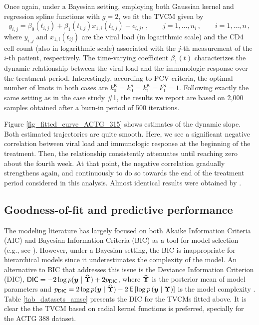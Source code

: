 \documentclass[letterpaper,10pt,openany]{article}
\newcommand{\expec}[1]{\textsf{E}\left[#1\right]}
\begin{document}
Once again, under a Bayesian setting, employing both Gaussian kernel and regression spline functions with $g=2$, we fit the TVCM given by
$$
y_{i,j} =\beta_0(t_{i,j}) + \beta_1(t_{i,j})x_{1,i}(t_{i,j}) + \epsilon_{i,j}, \,, \qquad j=1,\ldots,n_i\,,\qquad i=1,\ldots,n\,,
$$
where $y_{i,j}$ and $x_{1,i}(t_{ij})$ are the viral load (in logarithmic scale) and the CD4 cell count (also in logarithmic scale) associated with the $j$-th measurement of the $i$-th patient, respectively. The time-varying coefficient $\beta_1(t)$ characterizes the dynamic relationship between the viral load and the immunologic response over the treatment period. Interestingly, according to \textsf{PCV} criteria, the optimal number of knots in both cases are $k_0^{\textsf{K}} = k_0^{\textsf{S}} = k_1^{\textsf{K}} = k_1^{\textsf{S}} = 1$. {\color{black} Following exactly the same setting as in the case study \#1,} the results we report are based on 2,000 samples obtained after a burn-in period of 500 iterations. 


Figure \ref{fig_fitted_curve_ACTG_315} shows estimates of the dynamic slope. Both estimated trajectories are quite smooth. Here, we see a significant negative correlation between viral load and immunologic response at the beginning of the treatment. Then, the relationship consistently attenuates until reaching zero about the fourth week. At that point, the negative correlation gradually strengthens again, and continuously to do so towards the end of the treatment period considered in this analysis. Almost identical results were obtained by \cite{wu-2004-backfitting}.


\subsection{Goodness-of-fit and predictive performance}


The modeling literature has largely focused on both Akaike Information Criteria (\textsf{AIC}) and Bayesian Information Criteria (\textsf{BIC}) as a tool for model selection (e.g., see \citealp{wu-zhang-06}). However, under a Bayesian setting, the \textsf{BIC} is inappropriate for hierarchical models since it underestimates the complexity of the model.  An alternative to \textsf{BIC} that addresses this issue is the Deviance Information Criterion (\textsf{DIC}),
$\textsf{DIC} = - 2\log p ( \boldsymbol{y} \mid \widehat{\mathbf{\Upsilon}} ) + 2p_{\textsf{DIC}}$,
where $\widehat{\mathbf{\Upsilon}}$ is the posterior mean of model parameters and $p_{\textsf{DIC}} = 2 \log p ( \yv \mid \widehat{\UPS} ) - 2\, \expec{\log p \left(\yv \mid \UPS \right) }$ is the model complexity \citep[see][for a discussion]{gelman-2013-bayesian}.
Table \ref{tab_datasets_amse} presents the \textsf{DIC} for the TVCMs fitted above. It is clear the the TVCM based on radial kernel functions is preferred, specially for the ACTG 388 dataset.
\end{document}
